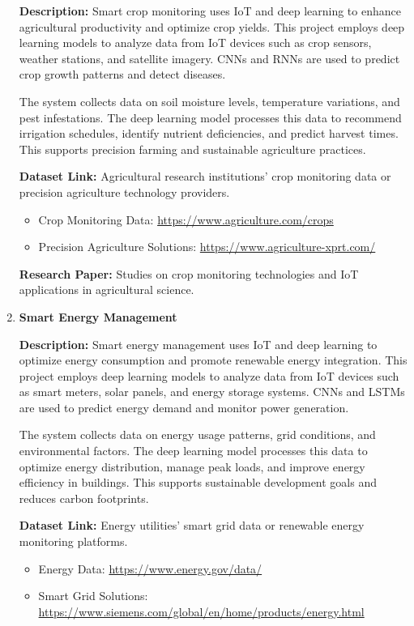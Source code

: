\documentclass{article}
\begin{document}
\begin{enumerate}[label=\textbf{\arabic*.}, leftmargin=*]
\textbf{Description:}
Smart crop monitoring uses IoT and deep learning to enhance agricultural productivity and optimize crop yields. This project employs deep learning models to analyze data from IoT devices such as crop sensors, weather stations, and satellite imagery. CNNs and RNNs are used to predict crop growth patterns and detect diseases.

The system collects data on soil moisture levels, temperature variations, and pest infestations. The deep learning model processes this data to recommend irrigation schedules, identify nutrient deficiencies, and predict harvest times. This supports precision farming and sustainable agriculture practices.

\textbf{Dataset Link:} Agricultural research institutions' crop monitoring data or precision agriculture technology providers.
\begin{itemize}
    \item Crop Monitoring Data: \url{https://www.agriculture.com/crops}
    \item Precision Agriculture Solutions: \url{https://www.agriculture-xprt.com/}
\end{itemize}

\textbf{Research Paper:} Studies on crop monitoring technologies and IoT applications in agricultural science.

\item \textbf{Smart Energy Management}

\textbf{Description:}
Smart energy management uses IoT and deep learning to optimize energy consumption and promote renewable energy integration. This project employs deep learning models to analyze data from IoT devices such as smart meters, solar panels, and energy storage systems. CNNs and LSTMs are used to predict energy demand and monitor power generation.

The system collects data on energy usage patterns, grid conditions, and environmental factors. The deep learning model processes this data to optimize energy distribution, manage peak loads, and improve energy efficiency in buildings. This supports sustainable development goals and reduces carbon footprints.

\textbf{Dataset Link:} Energy utilities' smart grid data or renewable energy monitoring platforms.
\begin{itemize}
    \item Energy Data: \url{https://www.energy.gov/data/}
    \item Smart Grid Solutions: \url{https://www.siemens.com/global/en/home/products/energy.html}
\end{itemize}


\end{enumerate}
\end{document}
